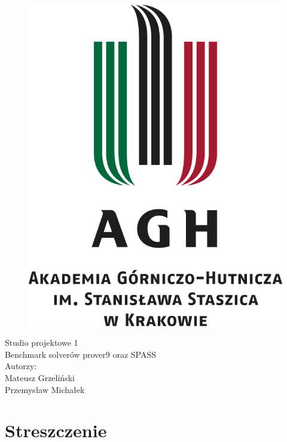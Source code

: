 \documentclass[a4paper,12pt]{article}
\begin{document}
\onehalfspacing
\begin{figure}[!htb]
  \centerline{\includegraphics[scale=0.8]{images/agh_logo.jpg}}
\end{figure}

\begin{center}
  \Huge{Studio projektowe 1\\}
  \Large{Benchmark solverów prover9 oraz SPASS\\}
  \vspace{5cm}
  \Large{	Autorzy:\\
    Mateusz Grzeliński\\
  Przemysław Michałek\\}

  \newpage
\end{center}

\tableofcontents
\newpage

\section{Streszczenie}
\end{document}
